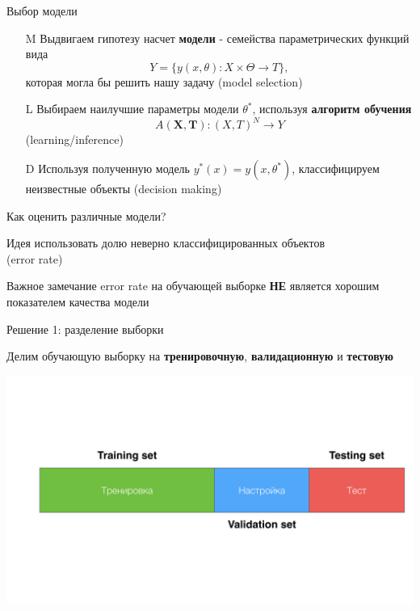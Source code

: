 \documentclass[10pt,a4paper]{beamer}
\begin{document}
\begin{frame}{Выбор модели}

\begin{enumerate}

\item[M] {Выдвигаем гипотезу насчет {\bf модели} - семейства параметрических функций вида
\[
Y = \{ y(x, \theta) : X \times \Theta \rightarrow T \},
\]
которая могла бы решить нашу задачу (model selection)}

\item[L] {\color{gray} Выбираем наилучшие параметры модели $\theta^*$, используя {\bf алгоритм обучения}
\[
A(\boldsymbol X, \boldsymbol T) : (X, T)^N \rightarrow Y
\]
(learning/inference)}

\item[D] {\color{gray} Используя полученную модель $y^*(x) = y(x, \theta^*)$, классифицируем неизвестные объекты (decision making)}

\end{enumerate}

\end{frame}


\begin{frame}{Как оценить различные модели?}

\begin{block}{Идея}
использовать долю неверно классифицированных объектов \\ (error rate)
\end{block}

\begin{alertblock}{Важное замечание}
error rate на обучающей выборке {\bf НЕ} является хорошим показателем качества модели
\end{alertblock}

\end{frame}


\begin{frame}{Решение 1: разделение выборки}

Делим обучающую выборку на {\bf тренировочную}, {\bf валидационную} и {\bf тестовую}

\begin{center}
\includegraphics[scale=0.15]{images/vtt.png}
\end{center}
  
 \end{frame}
 
\end{document}
